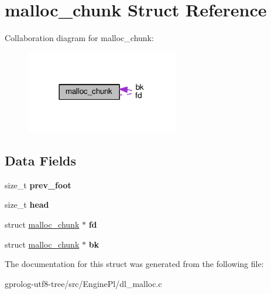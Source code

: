 \hypertarget{structmalloc__chunk}{}\section{malloc\+\_\+chunk Struct Reference}
\label{structmalloc__chunk}


Collaboration diagram for malloc\+\_\+chunk\+:\nopagebreak
\begin{figure}[H]
\begin{center}
\leavevmode
\includegraphics[width=189pt]{structmalloc__chunk__coll__graph}
\end{center}
\end{figure}
\subsection*{Data Fields}
\begin{DoxyCompactItemize}
\item 
size\+\_\+t {\bfseries prev\+\_\+foot}\hypertarget{structmalloc__chunk_a2cbb92874183d7a4b42e150b7d7ec1f9}{}\label{structmalloc__chunk_a2cbb92874183d7a4b42e150b7d7ec1f9}

\item 
size\+\_\+t {\bfseries head}\hypertarget{structmalloc__chunk_a7383bb525d34ca811283c927086205bc}{}\label{structmalloc__chunk_a7383bb525d34ca811283c927086205bc}

\item 
struct \hyperlink{structmalloc__chunk}{malloc\+\_\+chunk} $\ast$ {\bfseries fd}\hypertarget{structmalloc__chunk_a9972ab720231dd0c0d3c202176ce13c5}{}\label{structmalloc__chunk_a9972ab720231dd0c0d3c202176ce13c5}

\item 
struct \hyperlink{structmalloc__chunk}{malloc\+\_\+chunk} $\ast$ {\bfseries bk}\hypertarget{structmalloc__chunk_a268940e08c9c09fc3b2e23cd804bce3c}{}\label{structmalloc__chunk_a268940e08c9c09fc3b2e23cd804bce3c}

\end{DoxyCompactItemize}


The documentation for this struct was generated from the following file\+:\begin{DoxyCompactItemize}
\item 
gprolog-\/utf8-\/tree/src/\+Engine\+Pl/dl\+\_\+malloc.\+c\end{DoxyCompactItemize}
